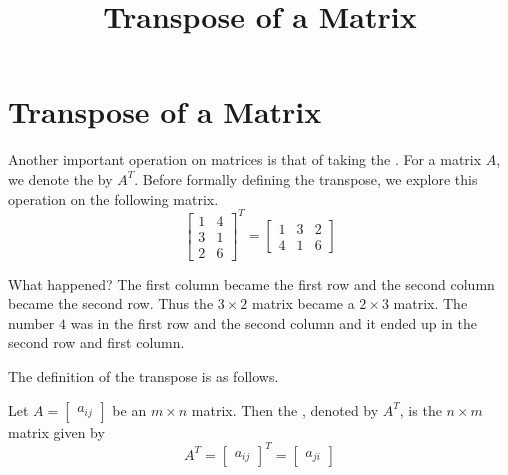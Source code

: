 \documentclass{ximera}
\title{Transpose of a Matrix} \license{CC BY-NC-SA 4.0}
\begin{document}
\begin{abstract}
  \end{abstract}
\maketitle



\section*{Transpose of a Matrix}



Another important operation on matrices is that of taking the . For a matrix $A$, we denote the
 by $A^T$. Before formally defining the transpose, we explore this
operation on the following matrix.
\begin{equation*}
\begin{bmatrix}
1 & 4 \\
3 & 1 \\
2 & 6
\end{bmatrix}^{T}=
\begin{bmatrix}
1 & 3 & 2 \\
4 & 1 & 6
\end{bmatrix}
\end{equation*}

What happened? The first column became the first row and the second column
became the second row. Thus the $3\times 2$ matrix became a $2\times 3$
matrix. The number $4$ was in the first row and the second column and it
ended up in the second row and first column. 

The definition of the transpose is as follows.

\begin{definition}\label{def:matrixtranspose}
Let $A=\begin{bmatrix} a _{ij}\end{bmatrix}$ be an $m\times n$ matrix. Then the , denoted by $A^{T}$, is the $n\times m$
matrix given by 
\begin{equation*}
A^{T} = \begin{bmatrix} a _{ij}\end{bmatrix}^{T}= \begin{bmatrix} a_{ji} \end{bmatrix}
\end{equation*}
\end{definition}
\end{document}
